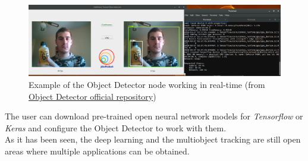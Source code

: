 \begin{figure}[H]
\begin{center}
\includegraphics[scale=0.25]{figures/object_detector.png}
\caption{Example of the Object Detector node working in real-time (from \href{https://github.com/JdeRobot/dl-objectdetector}{Object Detector official repository})}
\label{fig:object_detector}
\end{center}
\end{figure}
The user can download pre-trained open neural network models for \textit{Tensorflow} or \textit{Keras} and configure the Object Detector to work with them.\\
As it has been seen, the deep learning and the multiobject tracking are still open areas where multiple applications can be obtained.\\
\\ \ \\
